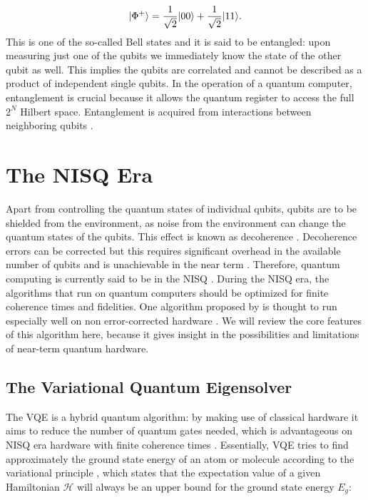 \begin{equation}\label{eq:Entangled}
	\lvert\Phi^+\rangle = \frac{1}{\sqrt{2}} \lvert00\rangle+ \frac{1}{\sqrt{2}} \lvert11\rangle.
\end{equation}
This is one of the so-called Bell states \cite{Nielsen2011} and it is said to be entangled: upon measuring just one of the qubits we immediately know the state of the other qubit as well.
This implies the qubits are correlated and cannot be described as a product of independent single qubits.
In the operation of a quantum computer, entanglement is crucial because it allows the quantum register to access the full $2^N$ Hilbert space.
Entanglement is acquired from interactions between neighboring qubits \cite{Henriet2020}.

\section{The NISQ Era}

Apart from controlling the quantum states of individual qubits, qubits are to be shielded from the environment, as noise from the environment can change the quantum states of the qubits. 
This effect is known as decoherence \cite{DiVincenzo2000}. Decoherence errors can be corrected but this requires significant overhead in the available number of qubits and is unachievable in the near term \cite{Peres1985,Ladd2010}. 
Therefore, quantum computing is currently said to be in the \ac{NISQ} \cite{Preskill2018}.
During the NISQ era, the algorithms that run on quantum computers should be optimized for finite coherence times and fidelities. 
One algorithm proposed by \cite{Peruzzo2014} is thought to run especially well on non error-corrected hardware \cite{McClean2016}. We will review the core features of this algorithm here, because it gives insight in the possibilities and limitations of near-term quantum hardware.

\subsection{The Variational Quantum Eigensolver}

The \ac{VQE} is a hybrid quantum algorithm: by making use of classical hardware it aims to reduce the number of quantum gates needed, which is advantageous on NISQ era hardware with finite coherence times \cite{McClean2016}. 
Essentially, VQE tries to find approximately the ground state energy of an atom or molecule according to the variational principle \cite{Griffiths2004}, which states that the expectation value of a given Hamiltonian $\mathcal{H}$ will always be an upper bound for the ground state energy $E_g$:


